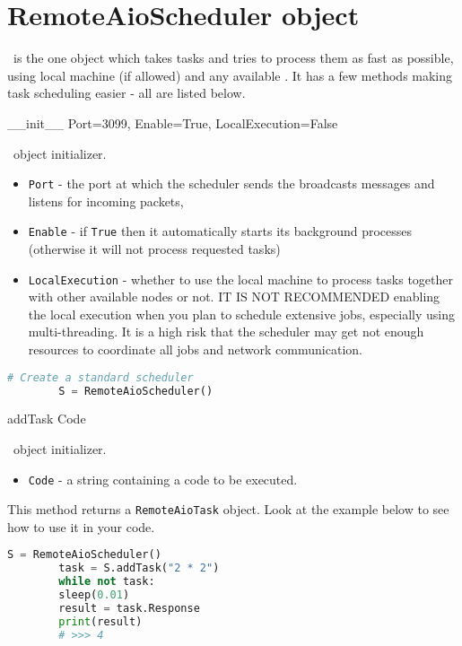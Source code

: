 \section{RemoteAioScheduler object}

\RemoteAioScheduler\ is the one object which takes tasks and tries to process them as fast as possible, using local machine (if allowed) and any available \RemoteAioNode. It has a few methods making task scheduling easier - all are listed below.

 {\_\_init\_\_} {Port=3099, Enable=True, LocalExecution=False} {
	\RemoteAioScheduler\ object initializer.
	\begin{itemize}
		\item \texttt{Port} - the port at which the scheduler sends the broadcasts messages and listens for incoming packets, 
		\item \texttt{Enable} - if \texttt{True} then it automatically starts its background processes (otherwise it will not process requested tasks)
		\item \texttt{LocalExecution} - whether to use the local machine to process tasks together with other available nodes or not. IT IS NOT RECOMMENDED enabling the local execution when you plan to schedule extensive jobs, especially using multi-threading. It is a high risk that the scheduler may get not enough resources to coordinate all jobs and network communication.
	\end{itemize}
}
\begin{lstlisting}[language=Python]
		# Create a standard scheduler
		S = RemoteAioScheduler()
\end{lstlisting}

 {addTask} {Code} {
	\RemoteAioScheduler\ object initializer.
	\begin{itemize}
		\item \texttt{Code} - a string containing a code to be executed.
	\end{itemize}
	This method returns a \texttt{RemoteAioTask} object. Look at the example below to see how to use it in your code.
}
\begin{lstlisting}[language=Python]
		S = RemoteAioScheduler()
		task = S.addTask("2 * 2")
		while not task:
		sleep(0.01)
		result = task.Response
		print(result)
		# >>> 4
\end{lstlisting}

